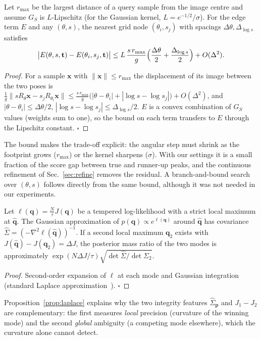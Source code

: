 \begin{proposition}
\label{prop:grid}
Let $r_{\max}$ be the largest distance of a query sample from the image centre
and assume $G_S$ is $L$-Lipschitz (for the Gaussian kernel,
$L=e^{-1/2}/\sigma$). For the edge term $E$ and any
$(\theta,s)$, the nearest grid node $(\theta_i,s_j)$ with spacings
$\Delta\theta,\Delta_{\log s}$ satisfies
\[
\bigl|E(\theta,s,\mathbf{t})-E(\theta_i,s_j,\mathbf{t})\bigr|
\le L\,\frac{s\,r_{\max}}{g}\Bigl(\frac{\Delta\theta}{2}+\frac{\Delta_{\log s}}{2}\Bigr)
+O(\Delta^2).
\]
\end{proposition}
\begin{proof}
For a sample $\mathbf{x}$ with $\|\mathbf{x}\|\le r_{\max}$ the displacement of
its image between the two poses is
$\tfrac{1}{g}\|sR_\theta\mathbf{x}-s_jR_{\theta_i}\mathbf{x}\|
\le\tfrac{s\,r_{\max}}{g}\bigl(|\theta-\theta_i|+|\log s-\log s_j|\bigr)+O(\Delta^2)$,
and $|\theta-\theta_i|\le\Delta\theta/2$,
$|\log s-\log s_j|\le\Delta_{\log s}/2$. $E$ is a convex combination of
$G_S$ values (weights sum to one), so the bound on each term transfers to $E$
through the Lipschitz constant. $\square$
\end{proof}
The bound makes the trade-off explicit: the angular step must shrink as the
footprint grows ($r_{\max}$) or the kernel sharpens ($\sigma$). With our
settings it is a small fraction of the score gap between true and runner-up
peaks, and the continuous refinement of Sec.~\ref{sec:refine} removes the
residual. A branch-and-bound search over $(\theta,s)$ follows directly from the
same bound, although it was not needed in our experiments.

\begin{proposition}
\label{prop:laplace}
Let $\ell(\mathbf{q})=\tfrac{N}{\tau}J(\mathbf{q})$ be a tempered
log-likelihood with a strict local maximum at $\hat{\mathbf{q}}$. The Gaussian
approximation of $p(\mathbf{q})\propto e^{\ell(\mathbf{q})}$ around
$\hat{\mathbf{q}}$ has covariance
$\hat\Sigma=(-\nabla^2\ell(\hat{\mathbf{q}}))^{-1}$.
If a second local maximum $\mathbf{q}_2$ exists with $J(\hat{\mathbf{q}})-J(\mathbf{q}_2)=\Delta J$,
the posterior mass ratio of the two modes is approximately
$\exp(N\Delta J/\tau)\sqrt{\det\hat\Sigma/\det\Sigma_2}$.
\end{proposition}
\begin{proof}
Second-order expansion of $\ell$ at each mode and Gaussian integration
(standard Laplace approximation~\cite{mackay2003information}). $\square$
\end{proof}
Proposition~\ref{prop:laplace} explains why the two integrity features
$\hat\Sigma_{\mathbf{p}}$ and $J_1-J_2$ are complementary: the first measures
\emph{local} precision (curvature of the winning mode) and the second
\emph{global} ambiguity (a competing mode elsewhere), which the curvature alone
cannot detect.
